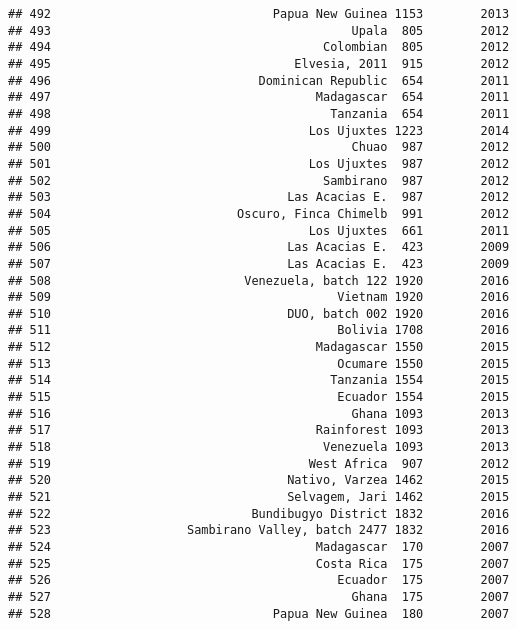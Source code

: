 \documentclass[
]{article}
\begin{document}
\begin{verbatim}
## 492                               Papua New Guinea 1153        2013
## 493                                          Upala  805        2012
## 494                                      Colombian  805        2012
## 495                                  Elvesia, 2011  915        2012
## 496                             Dominican Republic  654        2011
## 497                                     Madagascar  654        2011
## 498                                       Tanzania  654        2011
## 499                                    Los Ujuxtes 1223        2014
## 500                                          Chuao  987        2012
## 501                                    Los Ujuxtes  987        2012
## 502                                      Sambirano  987        2012
## 503                                 Las Acacias E.  987        2012
## 504                          Oscuro, Finca Chimelb  991        2012
## 505                                    Los Ujuxtes  661        2011
## 506                                 Las Acacias E.  423        2009
## 507                                 Las Acacias E.  423        2009
## 508                           Venezuela, batch 122 1920        2016
## 509                                        Vietnam 1920        2016
## 510                                 DUO, batch 002 1920        2016
## 511                                        Bolivia 1708        2016
## 512                                     Madagascar 1550        2015
## 513                                        Ocumare 1550        2015
## 514                                       Tanzania 1554        2015
## 515                                        Ecuador 1554        2015
## 516                                          Ghana 1093        2013
## 517                                     Rainforest 1093        2013
## 518                                      Venezuela 1093        2013
## 519                                    West Africa  907        2012
## 520                                 Nativo, Varzea 1462        2015
## 521                                 Selvagem, Jari 1462        2015
## 522                            Bundibugyo District 1832        2016
## 523                   Sambirano Valley, batch 2477 1832        2016
## 524                                     Madagascar  170        2007
## 525                                     Costa Rica  175        2007
## 526                                        Ecuador  175        2007
## 527                                          Ghana  175        2007
## 528                               Papua New Guinea  180        2007

\end{verbatim}
\end{document}
